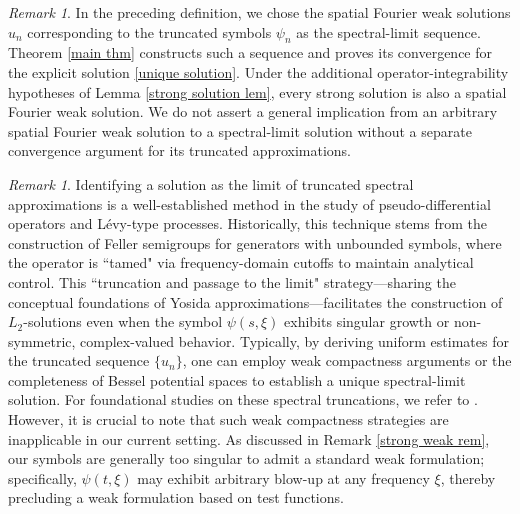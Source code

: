 \documentclass[11pt,reqno]{amsart}
\theoremstyle{definition}
\theoremstyle{remark}
\newtheorem{rem}[thm]{Remark}
\numberwithin{equation}{section}
\begin{document}
\begin{rem}
									\label{solution inculsion remark}
 In the preceding definition, we chose the spatial Fourier weak solutions $u_n$ corresponding to the truncated symbols $\psi_n$ as the spectral-limit sequence. 
Theorem \ref{main thm} constructs such a sequence and proves its convergence for the explicit solution \eqref{unique solution}. 
Under the additional operator-integrability hypotheses of Lemma \ref{strong solution lem}, every strong solution is also a spatial Fourier weak solution. We do not assert a general implication from an arbitrary spatial Fourier weak solution to a spectral-limit solution without a separate convergence argument for its truncated approximations.
\end{rem}


\begin{rem}
Identifying a solution as the limit of truncated spectral approximations is a well-established method in the study of pseudo-differential operators and Lévy-type processes. 
Historically, this technique stems from the construction of Feller semigroups for generators with unbounded symbols, where the operator is ``tamed" via frequency-domain cutoffs to maintain analytical control. 
This ``truncation and passage to the limit" strategy—sharing the conceptual foundations of Yosida approximations—facilitates the construction of $L_2$-solutions even when the symbol $\psi(s, \xi)$ exhibits singular growth or non-symmetric, complex-valued behavior. 
Typically, by deriving uniform estimates for the truncated sequence $\{u_n\}$, one can employ weak compactness arguments or the completeness of Bessel potential spaces to establish a unique spectral-limit solution. 
For foundational studies on these spectral truncations, we refer to \cite{FJS1, J1, Ke1}. However, it is crucial to note that such weak compactness strategies are inapplicable in our current setting. 
As discussed in Remark \ref{strong weak rem}, our symbols are generally too singular to admit a standard weak formulation; 
specifically, $\psi(t, \xi)$ may exhibit arbitrary blow-up at any frequency $\xi$, thereby precluding a weak formulation based on test functions.


\end{rem}
\end{document}
